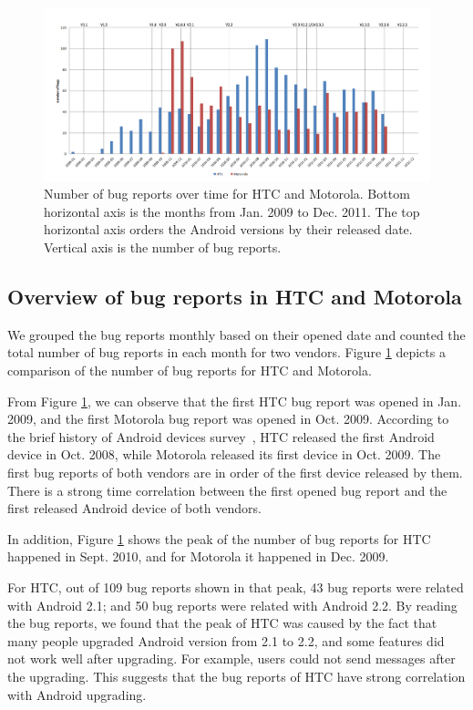 \documentclass[10pt, conference, compsocconf]{IEEEtran}
\begin{document}
\begin{figure}[htb]
\centering
\includegraphics[width=1\textwidth]{bugovertime.png}
\caption{Number of bug reports over time for HTC and Motorola. Bottom horizontal axis is the months from Jan. 2009 to Dec. 2011. The top horizontal axis orders the Android versions by their released date. Vertical axis is the number of bug reports.}
\label{bugovertime}
\end{figure}

\subsection{Overview of bug reports in HTC and Motorola}

We grouped the bug reports monthly based on their opened date and counted the total number of bug reports in each month for two vendors. Figure \ref{bugovertime} depicts a comparison of the number of bug reports for HTC and Motorola.

From Figure \ref{bugovertime}, we can observe that the first HTC bug report was opened in Jan. 2009, and the first Motorola bug report was opened in Oct. 2009. According to the brief history of Android devices survey~\cite{historyofandroid}, HTC released the first Android device in Oct. 2008, while Motorola released its first device in Oct. 2009. The first bug reports of both vendors are in order of the first device released by them. There is a strong time correlation between the first opened bug report and the first released Android device of both vendors.

In addition, Figure \ref{bugovertime} shows the peak of the number of bug reports for HTC happened in Sept. 2010, and for Motorola it happened in Dec. 2009. 

For HTC, out of 109 bug reports shown in that peak, 43 bug reports were related with Android 2.1; and 50 bug reports were related with Android 2.2. By reading the bug reports, we found that the peak of HTC was caused by the fact that many people upgraded Android version from 2.1 to 2.2, and some features did not work well after upgrading. For example, users could not send messages after the upgrading. This suggests that the bug reports of HTC have strong correlation with Android upgrading. 
\end{document}
